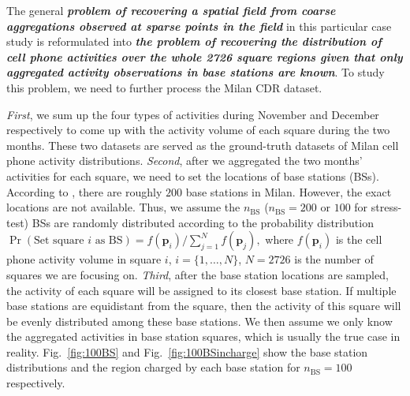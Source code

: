 The general \textbf{\textit{problem of recovering a spatial field from coarse aggregations observed at sparse points in
the field}} in this particular case study is reformulated into \textbf{\textit{the problem of recovering the distribution of cell phone activities over the whole 2726 square regions given that only aggregated activity observations in base stations are known}}. To study this problem, we need to further process the Milan CDR dataset.

\textit{First}, we sum up the four types of activities during November and December respectively to come up with the activity volume of each square during the two months. These two datasets are served as the ground-truth datasets of Milan cell phone activity distributions.
\textit{Second}, after we aggregated the two months' activities for each square, we need to set the locations of base stations (BSs). According to \cite{ratti2006mobile}, there are roughly $200$ base stations in Milan. However, the exact locations are not available. Thus, we assume the $n_{\text{BS}}$ ($n_{\text{BS}} = 200$ or $100$ for stress-test) BSs are randomly distributed according to the probability distribution
$
\Pr (\text{Set square $i$ as BS}) = f(\mathbf p_i) / \sum_{j=1}^{N}f(\mathbf p_j),
$
where $f(\mathbf p_i)$ is the cell phone activity volume in square $i$, $i=\{1, \ldots, N\}$, $N=2726$ is the number of squares we are focusing on. 
\textit{Third}, after the base station locations are sampled, the activity of each square will be assigned to its closest base station. If multiple base stations are equidistant from the square, then the activity of this square will be evenly distributed among these base stations. We then assume we only know the aggregated activities in base station squares, which is usually the true case in reality.
Fig.~\ref{fig:100BS} and Fig.~\ref{fig:100BSincharge} show the base station distributions and the region charged by each base station for $n_{\text{BS}} = 100$ respectively.

